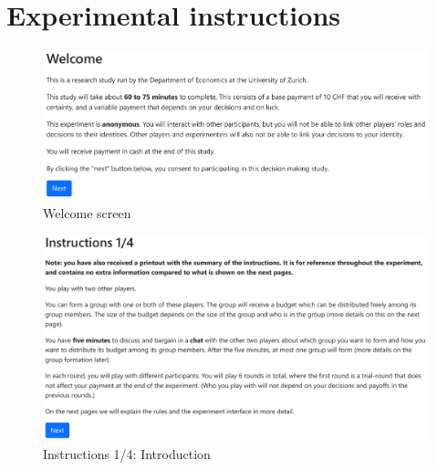 \section{Experimental instructions} \label{subsec:instructions}

\begin{figure}[!htb]
    \centering
    \includegraphics[width=.9\linewidth]{screenshots/welcome.pdf}
    \caption{Welcome screen}
\end{figure}

\begin{figure}[!htb]
    \centering
    \includegraphics[width=.9\linewidth]{screenshots/instructions_1.pdf}
    \caption{Instructions 1/4: Introduction}
\end{figure}

